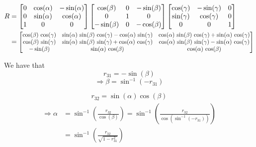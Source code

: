\newcommand{\ca}{\mathrm{c}}
\newcommand{\sa}{\mathrm{s}}

\begin{align}
    R & =
    \begin{bmatrix}
        0 & \cos(\alpha) & -\sin(\alpha) \\
        0 & \sin(\alpha) & \cos(\alpha)  \\
        1 & 0            & 0             \\
    \end{bmatrix}
    \begin{bmatrix}
        \cos(\beta)  & 0 & -\sin(\beta) \\
        0            & 1 & 0            \\
        -\sin(\beta) & 0 & -\cos(\beta)
    \end{bmatrix}
    \begin{bmatrix}
        \cos(\gamma) & -\sin(\gamma) & 0 \\
        \sin(\gamma) & \cos(\gamma)  & 0 \\
        0            & 0             & 1
    \end{bmatrix} \nonumber \\
      & =
    \scalemath{0.85}{
        \begin{bmatrix}
            \cos(\beta)\,\cos(\gamma) & \sin(\alpha)\,\sin(\beta)\,\cos(\gamma) - \cos(\alpha)\,\sin(\gamma) & \cos(\alpha)\,\sin(\beta)\,\cos(\gamma) + \sin(\alpha)\,\cos(\gamma) \\
            \cos(\beta)\,\sin(\gamma) & \sin(\alpha)\,\sin(\beta)\,\sin(\gamma) + \cos(\alpha)\,\cos(\gamma) & \cos(\alpha)\,\sin(\beta)\,\sin(\gamma) - \sin(\alpha)\,\cos(\gamma) \\
            -\sin(\beta)              & \sin(\alpha)\,\cos(\beta)                                            & \cos(\alpha)\,\cos(\beta)
        \end{bmatrix}
    }
\end{align}

We have that
\begin{equation*}
    r_{31} = -\sin(\beta) \nonumber
\end{equation*}
\begin{equation}
    \Rightarrow \beta = \sin^{-1}(-r_{31})
\end{equation}

\begin{equation*}
    r_{32} = \sin(\alpha)\cos(\beta)
\end{equation*}
\begin{align}
    \begin{split}
        \Rightarrow \alpha & = \sin^{-1}\left(\frac{r_{32}}{\cos(\beta)}\right)               = \sin^{-1}\left(\frac{r_{32}}{\cos(\sin^{-1}(-r_{31}))}\right) \\
        & = \sin^{-1}\left(\frac{r_{32}}{\sqrt{1-r_{31}^2}}\right)
    \end{split}
\end{align}

